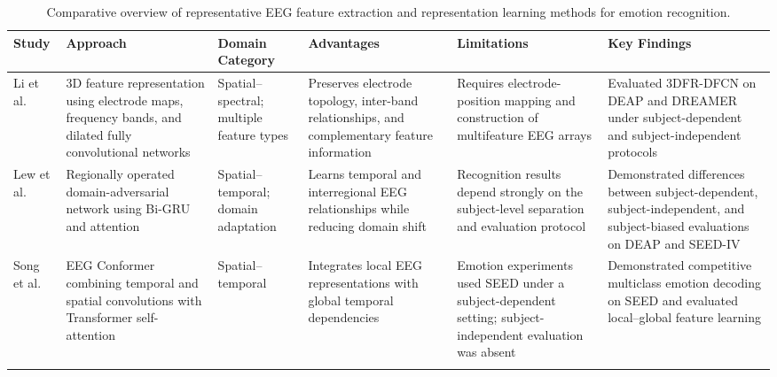 \documentclass[ASNA,twocolumn]{USG}
\newcommand{\lightrowsep}{%
  \arrayrulecolor{lightrowgray}%
  \specialrule{0.30pt}{3.5pt}{3.5pt}%
  \arrayrulecolor{black}%
}
\begin{document}
\begin{table}[tp]
\centering
\small
\setlength{\tabcolsep}{2pt}
\renewcommand{\arraystretch}{1.07}

\caption{Comparative overview of representative EEG
feature extraction and representation learning
methods for emotion recognition.}
\label{tab:eeg_feature_extraction_summary}

\begin{tabular}{
>{\raggedright\arraybackslash}p{}
>{\raggedright\arraybackslash}p{}
>{\raggedright\arraybackslash}p{}
>{\raggedright\arraybackslash}p{}
>{\raggedright\arraybackslash}p{}
>{\raggedright\arraybackslash}p{}
}

\toprule
\textbf{Study} &
\textbf{Approach} &
\textbf{Domain Category} &
\textbf{Advantages} &
\textbf{Limitations} &
\textbf{Key Findings} \\
\midrule

Li et al.~\cite{li2021eeg} &
3D feature representation using electrode maps,
frequency bands, and dilated fully
convolutional networks &
Spatial--spectral;
multiple feature types &
Preserves electrode topology, inter-band
relationships, and complementary
feature information &
Requires electrode-position mapping and
construction of multifeature EEG arrays &
Evaluated 3DFR-DFCN on DEAP and DREAMER
under subject-dependent and
subject-independent protocols \\
\lightrowsep

Lew et al.~\cite{lew2020eeg} &
Regionally operated domain-adversarial
network using Bi-GRU and attention &
Spatial--temporal;
domain adaptation &
Learns temporal and interregional EEG
relationships while reducing domain shift &
Recognition results depend strongly on
the subject-level separation and
evaluation protocol &
Demonstrated differences between
subject-dependent, subject-independent,
and subject-biased evaluations on
DEAP and SEED-IV \\
\lightrowsep

Song et al.~\cite{song2022eeg} &
EEG Conformer combining temporal and
spatial convolutions with Transformer
self-attention &
Spatial--temporal &
Integrates local EEG representations
with global temporal dependencies &
Emotion experiments used SEED under a
subject-dependent setting;
subject-independent evaluation was absent &
Demonstrated competitive multiclass
emotion decoding on SEED and
evaluated local--global feature learning \\
\lightrowsep


\end{tabular}
\end{table}
\end{document}
